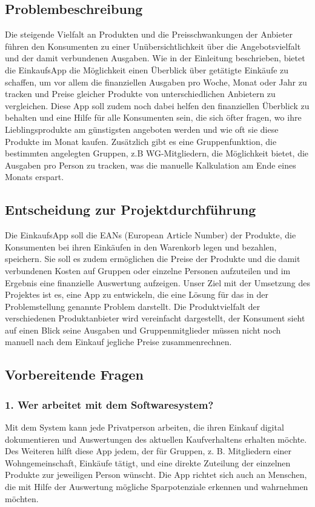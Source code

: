\documentclass[12pt,a4paper]{article}
\begin{document}
\subsection{Problembeschreibung}
Die steigende Vielfalt an Produkten und die Preisschwankungen der Anbieter führen den Konsumenten zu einer Unübersichtlichkeit über die Angebotsvielfalt und der damit verbundenen Ausgaben.
Wie in der Einleitung beschrieben, bietet die EinkaufsApp die Möglichkeit einen Überblick über getätigte Einkäufe zu schaffen,
um vor allem die finanziellen Ausgaben pro Woche, Monat oder Jahr zu tracken und Preise gleicher Produkte von unterschiedlichen Anbietern zu vergleichen.  
Diese App soll zudem noch dabei helfen den finanziellen Überblick zu behalten und eine Hilfe für alle Konsumenten sein, die sich öfter fragen, wo ihre Lieblingsprodukte am günstigsten angeboten werden und wie oft sie diese Produkte im Monat kaufen.
Zusätzlich gibt es eine Gruppenfunktion, die bestimmten angelegten Gruppen, z.B WG-Mitgliedern, die Möglichkeit bietet, die Ausgaben pro Person zu tracken, was die manuelle Kalkulation am Ende eines Monats erspart. 

\subsection{Entscheidung zur Projektdurchführung}
Die EinkaufsApp soll die EANs (European Article Number) der Produkte, die Konsumenten bei ihren Einkäufen in den Warenkorb legen und bezahlen, speichern.
Sie soll es zudem ermöglichen die Preise der Produkte und die damit verbundenen Kosten auf Gruppen oder einzelne Personen aufzuteilen und im Ergebnis eine finanzielle Auswertung aufzeigen.
Unser Ziel mit der Umsetzung des Projektes ist es, eine App zu entwickeln, die eine Lösung für das in der Problemstellung genannte Problem darstellt. 
Die Produktvielfalt der verschiedenen Produktanbieter wird vereinfacht dargestellt, der Konsument sieht auf einen Blick seine Ausgaben und Gruppenmitglieder müssen nicht noch manuell nach dem Einkauf jegliche Preise zusammenrechnen.

\newpage
\subsection{Vorbereitende Fragen}
\subsubsection*{1. Wer arbeitet mit dem Softwaresystem?}
Mit dem System kann jede Privatperson arbeiten, die ihren Einkauf digital dokumentieren und Auswertungen des aktuellen Kaufverhaltens erhalten möchte. Des Weiteren hilft diese App jedem, der für Gruppen, z. B. Mitgliedern einer Wohngemeinschaft, Einkäufe tätigt, und eine direkte Zuteilung der einzelnen Produkte zur jeweiligen Person wünscht. Die App richtet sich auch an Menschen, die mit Hilfe der Auswertung mögliche Sparpotenziale erkennen und wahrnehmen möchten. 
 
\end{document}

